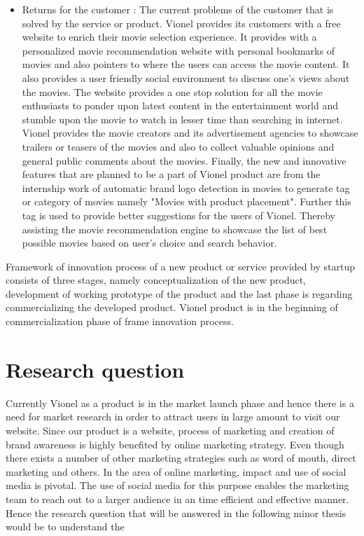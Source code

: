 \begin{itemize}
  \item Returns for the customer : The current problems of the customer that is solved by the service or product. Vionel provides its customers with a free website to enrich their movie selection experience. It provides with a personalized movie recommendation website with personal bookmarks of movies and also pointers to where the users can access the movie content. It also provides a user friendly social environment to discuss one's views about the movies. The website provides a one stop solution for all the movie enthusiasts to ponder upon latest content in the entertainment world and stumble upon the movie to watch in lesser time than searching in internet. Vionel provides the movie creators and its advertisement agencies to showcase trailers or teasers of the movies and also to collect valuable opinions and general public comments about the movies. Finally, the new and innovative features that are planned to be a part of Vionel product are from the internship work of automatic brand logo detection in movies to generate tag or category of movies namely "Movies with product placement". Further this tag is used to provide better suggestions for the users of Vionel. Thereby assisting the movie recommendation engine to showcase the list of best possible movies based on user's choice and search behavior.\\      
 \end{itemize}
 
 Framework of innovation process of a new product or service provided by startup consists of three stages, namely conceptualization of the new product, development of working prototype of the product and the last phase is regarding commercializing the developed product. Vionel product is in the beginning of commercialization phase of frame innovation process.
 
 \section{Research question}
 Currently Vionel as a product is in the market launch phase and hence there is a need for market research in order to attract users in large amount to visit our website. Since our product is a website, process of marketing and creation of brand awareness is highly benefited by online marketing strategy. Even though there exists a number of other marketing strategies such as word of mouth, direct marketing and others. In the area of online marketing, impact and use of social media is pivotal. The use of social media for this purpose enables the marketing team to reach out to a larger audience in an time efficient and effective manner.\\
 Hence the research question that will be answered in the following minor thesis would be to understand the      
       
 
  
                        
